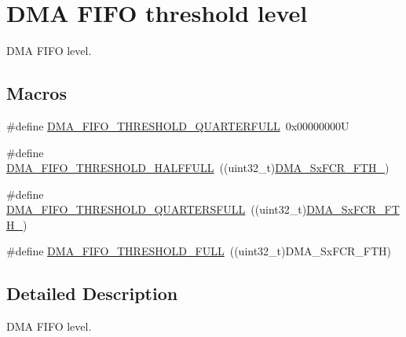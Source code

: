 \hypertarget{group___d_m_a___f_i_f_o__threshold__level}{}\section{D\+MA F\+I\+FO threshold level}
\label{group___d_m_a___f_i_f_o__threshold__level}


D\+MA F\+I\+FO level.  


\subsection*{Macros}
\begin{DoxyCompactItemize}
\item 
\#define \mbox{\hyperlink{group___d_m_a___f_i_f_o__threshold__level_ga4debbd5733190b61b2115613d4b3658b}{D\+M\+A\+\_\+\+F\+I\+F\+O\+\_\+\+T\+H\+R\+E\+S\+H\+O\+L\+D\+\_\+Q\+U\+A\+R\+T\+E\+R\+F\+U\+LL}}~0x00000000U
\item 
\#define \mbox{\hyperlink{group___d_m_a___f_i_f_o__threshold__level_gad2b071aa3a3bfc936017f12fb956c56f}{D\+M\+A\+\_\+\+F\+I\+F\+O\+\_\+\+T\+H\+R\+E\+S\+H\+O\+L\+D\+\_\+\+H\+A\+L\+F\+F\+U\+LL}}~((uint32\+\_\+t)\mbox{\hyperlink{group___peripheral___registers___bits___definition_ga63716e11d34bca95927671055aa63fe8}{D\+M\+A\+\_\+\+Sx\+F\+C\+R\+\_\+\+F\+T\+H\+\_}})
\item 
\#define \mbox{\hyperlink{group___d_m_a___f_i_f_o__threshold__level_gae1e4ba12bae8440421e6672795d71223}{D\+M\+A\+\_\+\+F\+I\+F\+O\+\_\+\+T\+H\+R\+E\+S\+H\+O\+L\+D\+\_\+Q\+U\+A\+R\+T\+E\+R\+S\+F\+U\+LL}}~((uint32\+\_\+t)\mbox{\hyperlink{group___peripheral___registers___bits___definition_gae3d780fc1222a183071c73e62a0524a1}{D\+M\+A\+\_\+\+Sx\+F\+C\+R\+\_\+\+F\+T\+H\+\_}})
\item 
\#define \mbox{\hyperlink{group___d_m_a___f_i_f_o__threshold__level_ga5de463bb24dc12fe7bbb300e1e4493f7}{D\+M\+A\+\_\+\+F\+I\+F\+O\+\_\+\+T\+H\+R\+E\+S\+H\+O\+L\+D\+\_\+\+F\+U\+LL}}~((uint32\+\_\+t)D\+M\+A\+\_\+\+Sx\+F\+C\+R\+\_\+\+F\+TH)
\end{DoxyCompactItemize}


\subsection{Detailed Description}
D\+MA F\+I\+FO level. 




